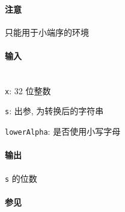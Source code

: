 \paragraph{注意}

只能用于小端序的环境

\paragraph{输入}~\\

\verb|x|: 32 位整数

\verb|s|: 出参, 为转换后的字符串

\verb|lowerAlpha|: 是否使用小写字母

\paragraph{输出}

\verb|s| 的位数

\paragraph{参见}

